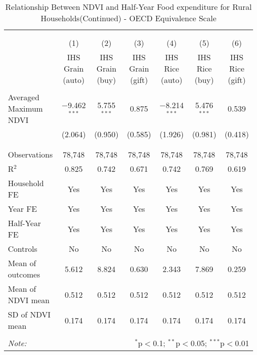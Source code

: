 
\begin{table}[!htbp] \centering 
  \caption{Relationship Between NDVI and Half-Year Food expenditure for Rural Households(Continued) - OECD Equivalence Scale} 
  \label{ndvi_table_2_1.tex} 
\normalsize 
\begin{tabular}{@{\extracolsep{5pt}}lcccccc} 
\\[-1.8ex]\hline 
\hline \\[-1.8ex] 
\\[-1.8ex] & (1) & (2) & (3) & (4) & (5) & (6)\\ 
 & IHS Grain (auto) & IHS Grain (buy) & IHS Grain (gift) & IHS Rice (auto) & IHS Rice (buy) & IHS Rice (gift) \\ 
\hline \\[-1.8ex] 
 Averaged Maximum NDVI & $-$9.462$^{***}$ & 5.755$^{***}$ & 0.875 & $-$8.214$^{***}$ & 5.476$^{***}$ & 0.539 \\ 
  & (2.064) & (0.950) & (0.585) & (1.926) & (0.981) & (0.418) \\ 
  & & & & & & \\ 
\hline \\[-1.8ex] 
Observations & 78,748 & 78,748 & 78,748 & 78,748 & 78,748 & 78,748 \\ 
R$^{2}$ & 0.825 & 0.742 & 0.671 & 0.742 & 0.769 & 0.619 \\ 
Household FE & Yes & Yes & Yes & Yes & Yes & Yes \\ 
Year FE & Yes & Yes & Yes & Yes & Yes & Yes \\ 
Half-Year FE & Yes & Yes & Yes & Yes & Yes & Yes \\ 
Controls & No & No & No & No & No & No \\ 
Mean of outcomes & 5.612 & 8.824 & 0.630 & 2.343 & 7.869 & 0.259 \\ 
Mean of NDVI mean & 0.512 & 0.512 & 0.512 & 0.512 & 0.512 & 0.512 \\ 
SD of NDVI mean & 0.174 & 0.174 & 0.174 & 0.174 & 0.174 & 0.174 \\ 
\hline \\[-1.8ex] 
\textit{Note:}  & \multicolumn{6}{r}{$^{*}$p$<$0.1; $^{**}$p$<$0.05; $^{***}$p$<$0.01} \\ 
\end{tabular} 
\end{table} 
